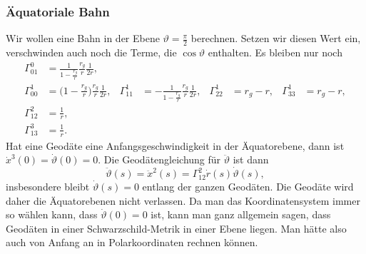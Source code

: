 \subsubsection{Äquatoriale Bahn}
Wir wollen eine Bahn in der Ebene $\vartheta=\frac{\pi}2$ berechnen.
Setzen wir diesen Wert ein, verschwinden auch noch die Terme, die
$\cos\vartheta$ enthalten.
Es bleiben nur noch
\begin{equation}
\begin{aligned}
\Gamma^0_{01}
&=
\frac{1}{1-\displaystyle\frac{r_g}{r}}
\frac{r_g}{r}
\frac{1}{2r},
\\
\Gamma^1_{00}
&=
\biggl(1-\displaystyle\frac{r_g}{r}\biggr)
\frac{r_g}{r}
\frac{1}{2r},
&
\Gamma^1_{11}
&=
-\frac1{1-\displaystyle\frac{r_g}{r}}
\frac{r_g}{r}
\frac{1}{2r},
&
\Gamma^1_{22}
&=
r_g-r,
&
\Gamma^1_{33}
&=
r_g-r,
\\
\Gamma^2_{12}
&=
\frac1r,
\\
\Gamma^3_{13}
&=
\frac1r.
\end{aligned}
\label{skript:schwarzschild:christoffelaequator}
\end{equation}
Hat eine Geodäte eine Anfangsgeschwindigkeit in der Äquatorebene, dann
ist $\dot x^3(0) = \dot\vartheta(0)=0$.
Die Geodätengleichung für $\ddot \vartheta$ ist dann
\[
\ddot \vartheta(s)
=
\ddot x^2(s)
=
\Gamma^2_{12}\dot r(s)\dot \vartheta(s),
\]
insbesondere bleibt $\dot\vartheta(s)=0$ entlang der ganzen Geodäten.
Die Geodäte wird daher die Äquatorebenen nicht verlassen.
Da man das Koordinatensystem immer so wählen kann, dass $\dot\vartheta(0)=0$
ist, kann man ganz allgemein sagen, dass Geodäten in einer Schwarzschild-Metrik
in einer Ebene liegen.
Man hätte also auch von Anfang an in Polarkoordinaten rechnen können.

